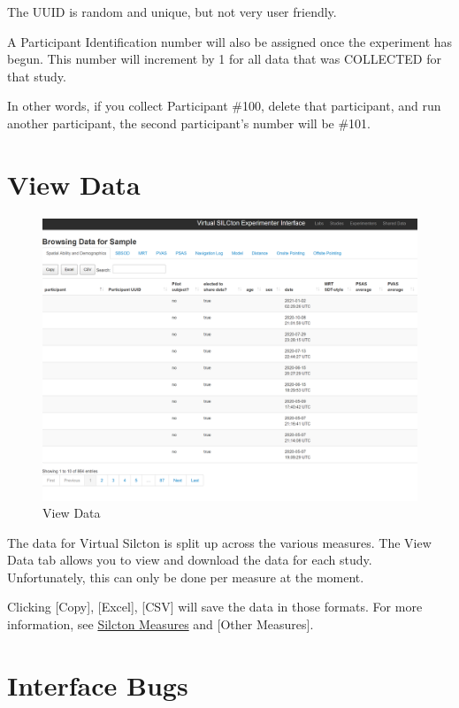 \documentclass[
  12pt,
]{book}
\begin{document}
The UUID is random and unique, but not very user friendly.

A Participant Identification number will also be assigned once the experiment has begun. This number will increment by 1 for all data that was COLLECTED for that study.

In other words, if you collect Participant \#100, delete that participant, and run another participant, the second participant's number will be \#101.

\hypertarget{view-data}{%
\section{View Data}\label{view-data}}

\begin{figure}
\centering
\includegraphics{./figs/web_studies_4.png}
\caption{View Data}
\end{figure}

The data for Virtual Silcton is split up across the various measures. The View Data tab allows you to view and download the data for each study. Unfortunately, this can only be done per measure at the moment.

Clicking {[}Copy{]}, {[}Excel{]}, {[}CSV{]} will save the data in those formats. For more information, see \protect\hyperlink{silcton-measures}{Silcton Measures} and {[}Other Measures{]}.

\hypertarget{interface-bugs}{%
\section{Interface Bugs}\label{interface-bugs}}
\end{document}
